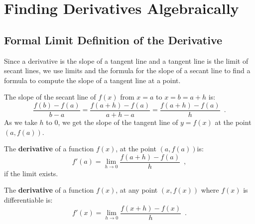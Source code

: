 \section{Finding Derivatives Algebraically}
\label{sec:algderiv}

\subsection{Formal Limit Definition of the Derivative}

Since a derivative is the slope of a tangent line and a tangent line is the limit of secant lines, we use limits and the formula for the slope of a secant line to find a formula to compute the slope of a tangent line at a point.

The slope of the secant line of $f(x)$ from $x=a$ to $x=b=a+h$ is:
$$\frac{f(b)-f(a)}{b-a}  = \frac{f(a+h)-f(a)}{a+h-a} = \frac{f(a+h)-f(a)}{h}\enspace .$$
As we take $h$ to $0$, we get the slope of the tangent line of $y=f(x)$ at the point $(a, f(a))$.

\begin{definition}
\label{def:deriv}
The {\bf derivative} of a function $f(x)$, at the point $(a, f(a))$is:
$$f'(a)=\lim_{h\to 0}\frac{f(a+h)-f(a)}{h} \enspace ,$$
if the limit exists.

The {\bf derivative} of a function $f(x)$, at any point $(x, f(x))$ where $f(x)$ is differentiable is:
$$f'(x)=\lim_{h\to 0}\frac{f(x+h)-f(x)}{h} \enspace .$$
\end{definition}

